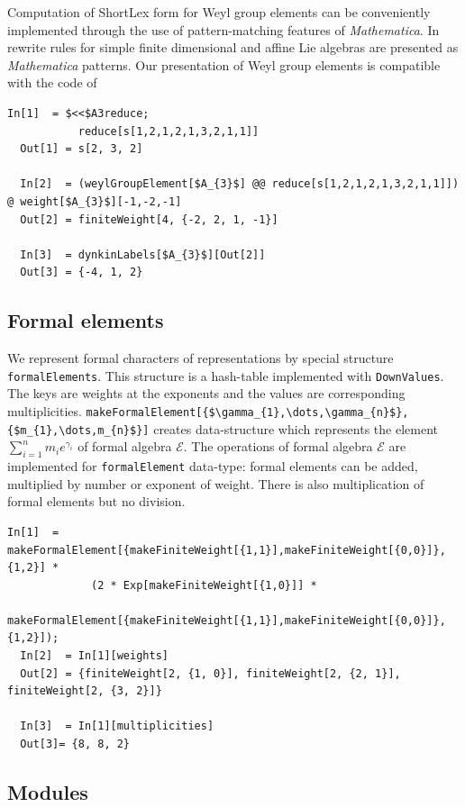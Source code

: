 \documentclass[preprint,12pt]{elsarticle}
\begin{document}
Computation of ShortLex form \cite{casselman1994machine,casselman1995automata} for Weyl group elements can be conveniently implemented through the use of pattern-matching features of {\it Mathematica}. In \cite{KallenShortlex} rewrite rules for simple finite dimensional and affine Lie algebras are presented as {\it Mathematica} patterns. Our presentation of Weyl group elements is compatible with the code of \cite{KallenShortlex}
\begin{lstlisting}[mathescape=true]
  In[1]  = $<<$A3reduce;
           reduce[s[1,2,1,2,1,3,2,1,1]]
  Out[1] = s[2, 3, 2]

  In[2]  = (weylGroupElement[$A_{3}$] @@ reduce[s[1,2,1,2,1,3,2,1,1]]) @ weight[$A_{3}$][-1,-2,-1]
  Out[2] = finiteWeight[4, {-2, 2, 1, -1}]

  In[3]  = dynkinLabels[$A_{3}$][Out[2]]
  Out[3] = {-4, 1, 2}
\end{lstlisting}

\subsection{Formal elements}
\label{sec:formal-elements}

We represent formal characters of representations by special structure \lstinline{formalElements}. This structure is a hash-table implemented with \lstinline{DownValues}. The keys are weights at the exponents and the values are corresponding multiplicities. \lstinline[mathescape=true]!makeFormalElement[{$\gamma_{1},\dots,\gamma_{n}$},{$m_{1},\dots,m_{n}$}]! creates data-structure which represents the element $\sum_{i=1}^{n} m_{i} e^{\gamma_{i}}$ of formal algebra $\mathcal{E}$. The operations of formal algebra $\mathcal{E}$ are implemented for \lstinline{formalElement} data-type: formal elements can be added, multiplied by number or exponent of weight. There is also multiplication of formal elements but no division.
\begin{lstlisting}[mathescape=true]
  In[1]  = makeFormalElement[{makeFiniteWeight[{1,1}],makeFiniteWeight[{0,0}]},{1,2}] *
             (2 * Exp[makeFiniteWeight[{1,0}]] *
             makeFormalElement[{makeFiniteWeight[{1,1}],makeFiniteWeight[{0,0}]},{1,2}]);
  In[2]  = In[1][weights]
  Out[2] = {finiteWeight[2, {1, 0}], finiteWeight[2, {2, 1}], finiteWeight[2, {3, 2}]}

  In[3]  = In[1][multiplicities]
  Out[3]= {8, 8, 2}
\end{lstlisting}

\subsection{Modules}
\label{sec:modules}
\end{document}
